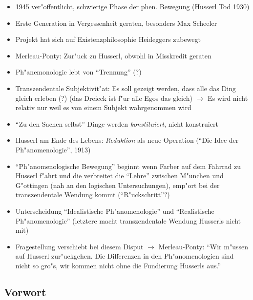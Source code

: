 \documentclass[emulatestandardclasses]{scrartcl}
\begin{document}
\begin{itemize}
  \item 1945 ver"offentlicht, schwierige Phase der phen. Bewegung (Husserl Tod 1930)
  \item Erste Generation in Vergessenheit geraten, besonders Max Scheeler
  \item Projekt hat sich auf Existenzphilosophie Heideggers zubewegt
  \item Merleau-Ponty: Zur"uck zu Husserl, obwohl in Misskredit geraten
  \item Ph"anemonologie lebt von "`Trennung"' (?)
  \item Transzendentale Subjektivit"at: Es soll gezeigt werden, dass alle das Ding gleich erleben (?) (das Dreieck ist f"ur alle Egos das gleich) $\rightarrow$ Es wird nicht relativ nur weil es von einem Subjekt wahrgenommen wird
  \item "`Zu den Sachen selbst"' Dinge werden \emph{konstituiert}, nicht konstruiert
  \item Husserl am Ende des Lebens: \emph{Reduktion} als neue Operation ("`Die Idee der Ph"anomenologie"', 1913)
  \item "`Ph"anomenologische Bewegung"' beginnt wenn Farber auf dem Fahrrad zu Husserl f"ahrt und die verbreitet die "`Lehre"' zwischen M"unchen und G"ottingen (nah an den logischen Untersuchungen), emp"ort bei der transzendentale Wendung kommt ("`R"uckschritt"'?)
  \item Unterscheidung "`Idealistische Ph"anomenologie"' und "`Realistische Ph"anomenologie"' (letztere macht transzendentale Wendung Husserls nicht mit)
  \item Fragestellung verschiebt bei diesem Disput $\rightarrow$ Merleau-Ponty: "`Wir m"ussen auf Husserl zur"uckgehen. Die Differenzen in den Ph"anomenologien sind nicht so gro"s, wir kommen nicht ohne die Fundierung Husserls aus."'
\end{itemize}

\subsection{Vorwort}
\end{document}
